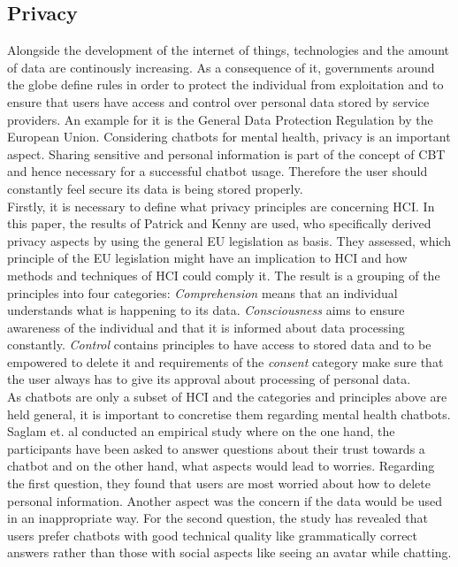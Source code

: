 \documentclass[sigconf, nonacm]{acmart}
\begin{document}
\subsection{Privacy}
Alongside the development of the internet of things, technologies and the amount of data are continously increasing\cite{Reinsel2018}.
As a consequence of it, governments around the globe define rules in order to protect the individual from exploitation and to ensure that users have access and control over personal data stored by service providers.
An example for it is the General Data Protection Regulation by the European Union. Considering chatbots for mental health, privacy is an important aspect. Sharing sensitive and personal information is part of the concept of CBT and hence necessary for a successful chatbot usage. Therefore the user should constantly feel secure its data is being stored properly. 
\\
Firstly, it is necessary to define what privacy principles are concerning HCI. In this paper, the results of Patrick and Kenny \cite{Patrick2003} are used, who specifically derived privacy aspects by using the general EU legislation as basis.
They assessed, which principle of the EU legislation might have an implication to HCI and how methods and techniques of HCI could comply it. The result is a grouping of the principles into four categories: \emph{Comprehension} means that an individual understands what is happening to its data. \emph{Consciousness} aims to ensure
awareness of the individual and that it is informed about data processing constantly. \emph{Control} contains principles to have access to stored data and to be empowered to delete it and requirements of the \emph{consent} category make sure that the user always has to give its approval about processing of personal data.
\\
As chatbots are only a subset of HCI and the categories and principles above are held general, it is important to concretise them regarding mental health chatbots.
\\
Saglam et. al \cite{Shamim2021} conducted an empirical study where on the one hand, the participants have been asked to answer questions about their trust towards a chatbot and 
on the other hand, what aspects would lead to worries. Regarding the first question, they found that users are most worried about how to delete personal information. Another aspect was the concern if the data would be used in an inappropriate way. 
For the second question, the study has revealed that users prefer chatbots with good technical quality like grammatically correct answers rather than those with social aspects like seeing an avatar while chatting.
\end{document}
